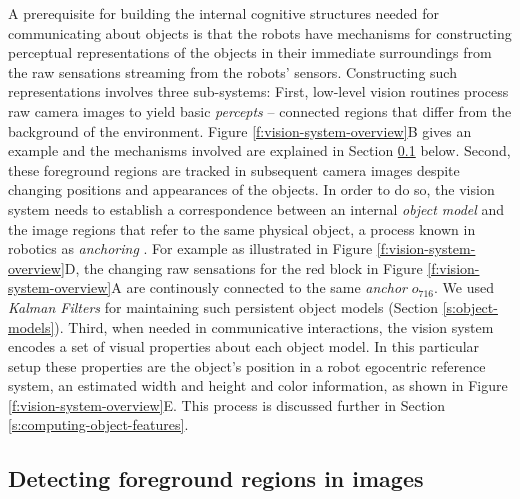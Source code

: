 A prerequisite for building the internal cognitive structures needed
for communicating about objects is that the robots have mechanisms for
constructing perceptual representations of the objects in their
immediate surroundings from the raw sensations streaming from the
robots' sensors. Constructing such representations involves three
sub-systems: First, low-level vision routines process raw camera
images to yield basic \emph{percepts} -- connected regions that differ
from the background of the environment. Figure
\ref{f:vision-system-overview}B gives an example and the mechanisms
involved are explained in Section \ref{s:detecting-foreground-regions}
below. Second, these foreground regions are tracked in subsequent
camera images despite changing positions and appearances of the
objects. In order to do so, the vision system needs to establish a
correspondence between an internal \emph{object model} and the image
regions that refer to the same physical object, a process known in
robotics as \emph{anchoring}
\citep{coradeschi03anchoring,loutfy05maintaining}. For example as
illustrated in Figure \ref{f:vision-system-overview}D, the changing
raw sensations for the red block in Figure
\ref{f:vision-system-overview}A are continously connected to the same
\emph{anchor} $o_{716}$. We used \emph{Kalman Filters} for maintaining
such persistent object models (Section \ref{s:object-models}). Third,
when needed in communicative interactions, the vision system encodes a
set of visual properties about each object model. In this particular
setup these properties are the object's position in a robot egocentric
reference system, an estimated width and height and color information,
as shown in Figure \ref{f:vision-system-overview}E. This process is
discussed further in Section \ref{s:computing-object-features}.


\subsection{Detecting foreground regions in images}
\label{s:detecting-foreground-regions}


